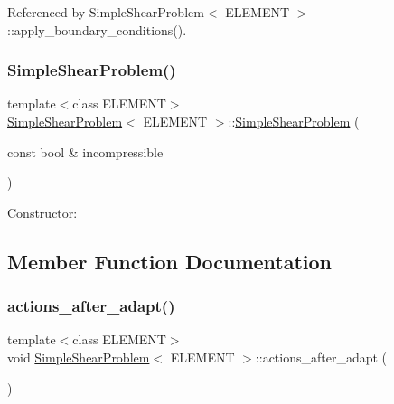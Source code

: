 Referenced by Simple\+Shear\+Problem$<$ E\+L\+E\+M\+E\+N\+T $>$\+::apply\+\_\+boundary\+\_\+conditions().

\mbox{\label{classSimpleShearProblem_ada0881781b3332f88362528be39613d2}} 
\subsubsection{\texorpdfstring{Simple\+Shear\+Problem()}{SimpleShearProblem()}\hspace{0.1cm}{\footnotesize\ttfamily [2/2]}}
{\footnotesize\ttfamily template$<$class E\+L\+E\+M\+E\+NT$>$ \\
\hyperlink{classSimpleShearProblem}{Simple\+Shear\+Problem}$<$ E\+L\+E\+M\+E\+NT $>$\+::\hyperlink{classSimpleShearProblem}{Simple\+Shear\+Problem} (\begin{DoxyParamCaption}\item[{const bool \&}]{incompressible }\end{DoxyParamCaption})}



Constructor\+: 



\subsection{Member Function Documentation}
\mbox{\label{classSimpleShearProblem_a9b493680096cdbccb0cfa18b35787165}} 
\subsubsection{\texorpdfstring{actions\+\_\+after\+\_\+adapt()}{actions\_after\_adapt()}}
{\footnotesize\ttfamily template$<$class E\+L\+E\+M\+E\+NT$>$ \\
void \hyperlink{classSimpleShearProblem}{Simple\+Shear\+Problem}$<$ E\+L\+E\+M\+E\+NT $>$\+::actions\+\_\+after\+\_\+adapt (\begin{DoxyParamCaption}{ }\end{DoxyParamCaption})\hspace{0.3cm}{\ttfamily [inline]}}



